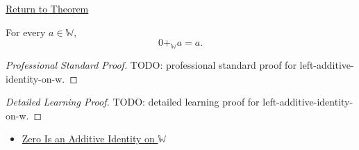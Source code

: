 \newpage
{}
\label{prf:left-additive-identity-on-w}

\begin{remark*}[Return]
\hyperref[thm:left-additive-identity-on-w]{Return to Theorem}
\end{remark*}

\begin{theorem*}
For every $a\in\mathbb{W}$,
\[
0+_{\mathbb{W}}a=a.
\]
\end{theorem*}

\begin{proof}[Professional Standard Proof]
\LRAProofBodyStart
TODO: professional standard proof for left-additive-identity-on-w.
\end{proof}

\begin{proof}[Detailed Learning Proof]
\LRAProofBodyStart
TODO: detailed learning proof for left-additive-identity-on-w.
\end{proof}

\begin{remark*}
\end{remark*}

\begin{dependencies}
\begin{itemize}
  \item \hyperref[thm:zero-additive-identity-on-w]{Zero Is an Additive Identity on $\mathbb{W}$}
\end{itemize}
\end{dependencies}

\clearpage
